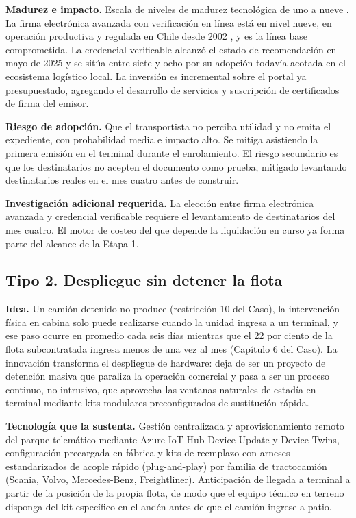 \textbf{Madurez e impacto.} Escala de niveles de madurez tecnológica de uno a nueve
\parencite{iso16290}. La firma electrónica avanzada con verificación en línea está en nivel nueve,
en operación productiva y regulada en Chile desde 2002 \parencite{ley19799}, y es la línea base
comprometida. La credencial verificable alcanzó el estado de recomendación en mayo de 2025
\parencite{w3c_vcdm2} y se sitúa entre siete y ocho por su adopción todavía acotada en el
ecosistema logístico local. La inversión es incremental sobre el portal ya presupuestado, agregando
el desarrollo de servicios y suscripción de certificados de firma del emisor.

\textbf{Riesgo de adopción.} Que el transportista no perciba utilidad y no
emita el expediente, con probabilidad media e impacto alto. Se mitiga asistiendo la primera emisión en el terminal durante el enrolamiento. El
riesgo secundario es que los destinatarios no acepten el documento como prueba, mitigado
levantando destinatarios reales en el mes cuatro antes de construir.

\textbf{Investigación adicional requerida.} La elección entre firma electrónica avanzada y
credencial verificable requiere el levantamiento de destinatarios del mes cuatro. El motor de
costeo del que depende la liquidación en curso ya forma parte del alcance de la Etapa 1.

\subsection{Tipo 2. Despliegue sin detener la flota}

\textbf{Idea.} Un camión detenido no produce (restricción 10 del Caso), la intervención física en cabina solo puede realizarse cuando la unidad ingresa a un terminal, y ese paso ocurre en promedio cada seis días mientras que el 22 por ciento de la flota subcontratada ingresa menos de una vez al mes (Capítulo 6 del Caso). La innovación transforma el despliegue de hardware: deja de ser un proyecto de detención masiva que paraliza la operación comercial y pasa a ser un proceso continuo, no intrusivo, que aprovecha las ventanas naturales de estadía en terminal mediante kits modulares preconfigurados de sustitución rápida.

\textbf{Tecnología que la sustenta.} Gestión centralizada y aprovisionamiento remoto del parque telemático mediante Azure IoT Hub Device Update y Device Twins, configuración precargada en fábrica y kits de reemplazo con arneses estandarizados de acople rápido (plug-and-play) por familia de tractocamión (Scania, Volvo, Mercedes-Benz, Freightliner). Anticipación de llegada a terminal a partir de la posición de la propia flota, de modo que el equipo técnico en terreno disponga del kit específico en el andén antes de que el camión ingrese a patio.

